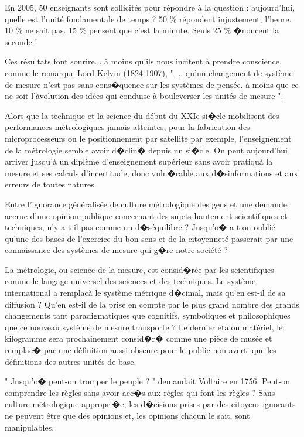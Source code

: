 En 2005, 50 enseignants sont sollicités pour répondre à la question : aujourd'hui, quelle est l'unité fondamentale de temps ?   50 \% répondent injustement, l'heure.  10 \% ne sait pas.  15 \% pensent que c'est la minute.  Seuls 25 \% �noncent la seconde !

Ces résultats font sourire... à moins qu'ils nous incitent à prendre conscience, comme le remarque Lord Kelvin (1824-1907), " ... qu'un changement de système de mesure n'est pas sans cons�quence sur les systèmes de pensée.  à moins que ce ne soit l'àvolution des idées qui conduise à bouleverser les unités de mesure ".

Alors que la technique et la science du début du XXIe si�cle mobilisent des performances métrologiques jamais atteintes, pour la fabrication des microprocesseurs ou le positionnement par satellite par exemple, l'enseignement de la métrologie semble avoir d�clin� depuis un si�cle. On peut aujourd'hui arriver jusqu'à un diplème d'enseignement supérieur sans avoir pratiquà la mesure et ses calculs d'incertitude, donc vuln�rable aux d�sinformations et aux erreurs de toutes natures.

Entre l'ignorance généralisée de culture métrologique des gens et une demande accrue d'une  opinion publique concernant des sujets hautement scientifiques et techniques, n'y a-t-il pas comme un d�séquilibre ?  Jusqu'o� a t-on oublié qu'une des bases de l'exercice du bon sens et de la citoyenneté passerait par une connaissance des systèmes de mesure qui g�re notre société ?

La métrologie, ou science de la mesure, est consid�rée par les scientifiques comme le langage universel des sciences et des techniques.  Le système international a remplacà le système métrique d�cimal, mais qu'en est-il de sa diffusion ?  Qu'en est-il de la prise en compte par le plus grand nombre des grands changements tant paradigmatiques que cognitifs, symboliques et philosophiques que ce nouveau système de mesure transporte ?  Le dernier étalon matériel, le kilogramme sera prochainement consid�r� comme une pièce de musée et remplac� par une définition aussi obscure pour le public non averti que les définitions des autres unités de base.

" Jusqu'o� peut-on tromper le peuple ? " demandait Voltaire en 1756.  Peut-on comprendre les règles sans avoir acc�s aux règles qui font les règles ?  Sans culture métrologique appropri�e, les d�cisions prises par des citoyens ignorants ne peuvent être que des opinions et, les opinions chacun le sait, sont manipulables.

